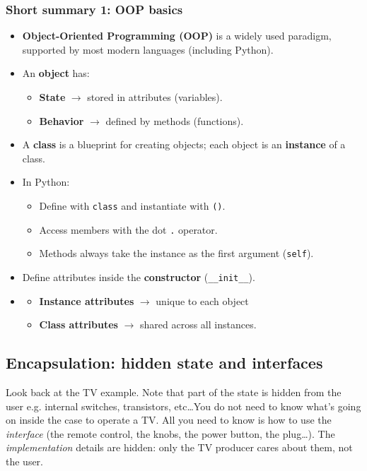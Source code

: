 \subsubsection{Short summary 1: OOP basics}
\begin{itemize}
  \item \textbf{Object-Oriented Programming (OOP)} is a widely used paradigm, supported by most modern languages (including Python).
  \item An \textbf{object} has:
    \begin{itemize}
      \item \textbf{State} $\rightarrow$ stored in attributes (variables).
      \item \textbf{Behavior} $\rightarrow$ defined by methods (functions).
    \end{itemize}
  \item A \textbf{class} is a blueprint for creating objects; each object is an \textbf{instance} of a class.
  \item In Python:
    \begin{itemize}
      \item Define with \texttt{class} and instantiate with \texttt{()}.
      \item Access members with the dot \texttt{.} operator.
      \item Methods always take the instance as the first argument (\texttt{self}).
    \end{itemize}
  \item Define attributes inside the \textbf{constructor} (\texttt{\_\_init\_\_}).
  \item \begin{itemize}
      \item \textbf{Instance attributes} $\rightarrow$ unique to each object
      \item \textbf{Class attributes} $\rightarrow$ shared across all instances.
  \end{itemize}
\end{itemize}

\subsection{Encapsulation: hidden state and interfaces}
Look back at the TV example. Note that part of the state is hidden from the user e.g. internal switches, transistors, etc\dots You do not need to know what's going on inside the case to operate a TV. All you need to know is how to use the \textit{interface} (the remote control, the knobs, the power button, the plug\dots). The \textit{implementation} details are hidden: only the TV producer cares about them, not the user.

